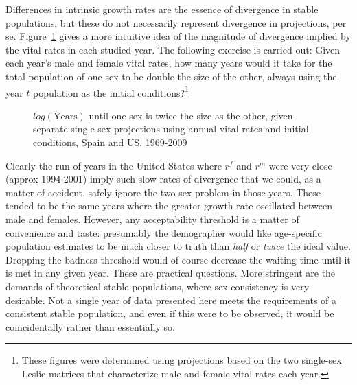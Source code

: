  \FloatBarrier
\label{sec:ageSRdoubling}
Differences in intrinsic growth rates are the essence of divergence in
stable populations, but these do not necessarily represent divergence in
projections, per se. Figure~\ref{fig:rSRdoubling} gives a more intuitive idea of
the magnitude of divergence implied by the vital rates in each studied year. The following
 exercise is carried out: Given each year's male and
female vital rates, how many years would it take for the total population of one
sex to be double the size of the other, always using the year $t$ population as
the initial conditions?\footnote{These figures were determined using projections
based on the two single-sex Leslie matrices that characterize male and female
vital rates each year.}

\begin{figure}[ht!]
        \centering  
          \caption{$log(\mathrm{Years})$ until one sex is twice the size as the
          other, given separate single-sex projections using annual vital rates and initial
          conditions, Spain and US, 1969-2009}
           \quad
          \label{fig:rSRdoubling}
\end{figure}

Clearly the run of years in the United States where $r^f$ and $r^m$ were very
close (approx 1994-2001) imply such slow rates of divergence that we could, as a
matter of accident, safely ignore the two sex problem in those years. These
tended to be the same years where the greater growth rate oscillated between
male and females. However, any acceptability threshold is a matter of
convenience and taste: presumably the demographer would like age-specific 
population estimates to be much closer to truth than \textit{half} or \textit{twice} the ideal value.
Dropping the badness threshold would of course decrease the waiting time until
it is met in any given year. These are practical questions. More
stringent are the demands of theoretical stable populations, where
sex consistency is very desirable. Not a single year of data presented here
meets the requirements of a consistent stable population, and even if this were
to be observed, it would be coincidentally rather than essentially so. 
